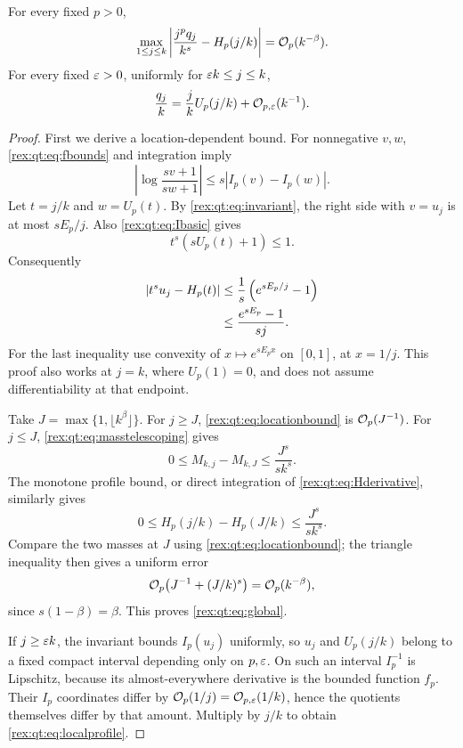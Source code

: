 \begin{theorem}\label{rex:qt:thm:global}
For every fixed $p>0$,
\begin{equation}\label{rex:qt:eq:global}
 \max_{1\le j\le k}\left|\frac{j^p q_j}{k^s}-H_p(j/k)\right|
       =\mathcal O_p(k^{-\beta}).
\end{equation}
For every fixed $\varepsilon>0$, uniformly for $\varepsilon k\le j\le k$,
\begin{equation}\label{rex:qt:eq:localprofile}
 \frac{q_j}{k}=\frac jk U_p(j/k)+\mathcal O_{p,\varepsilon}(k^{-1}).
\end{equation}
\end{theorem}
\begin{proof}
First we derive a location-dependent bound. For nonnegative $v,w$, \eqref{rex:qt:eq:fbounds} and integration imply
\begin{equation}\label{rex:qt:eq:logcomparison}
 \left|\log\frac{sv+1}{sw+1}\right|
 \le s\left|I_p(v)-I_p(w)\right|.
\end{equation}
Let $t=j/k$ and $w=U_p(t)$. By \eqref{rex:qt:eq:invariant}, the right side with $v=u_j$ is at most $sE_p/j$. Also \eqref{rex:qt:eq:Ibasic} gives
\begin{equation}\label{rex:qt:eq:weightbound}
 t^s(sU_p(t)+1)\le1.
\end{equation}
Consequently
\begin{align}
 \left|t^s u_j-H_p(t)\right|
 &\le\frac1s\left(e^{sE_p/j}-1\right)\notag\\
 &\le\frac{e^{sE_p}-1}{sj}.
 \label{rex:qt:eq:locationbound}
\end{align}
For the last inequality use convexity of $x\mapsto e^{sE_p x}$ on $[0,1]$, at $x=1/j$. This proof also works at $j=k$, where $U_p(1)=0$, and does not assume differentiability at that endpoint.

Take $J=\max\{1,\lfloor k^\beta\rfloor\}$. For $j\ge J$, \eqref{rex:qt:eq:locationbound} is $\mathcal O_p(J^{-1})$. For $j\le J$, \eqref{rex:qt:eq:masstelescoping} gives
\[
 0\le M_{k,j}-M_{k,J}\le\frac{J^s}{s k^s}.
\]
The monotone profile bound, or direct integration of \eqref{rex:qt:eq:Hderivative}, similarly gives
\[
 0\le H_p(j/k)-H_p(J/k)\le\frac{J^s}{s k^s}.
\]
Compare the two masses at $J$ using \eqref{rex:qt:eq:locationbound}; the triangle inequality then gives a uniform error
\[
 \mathcal O_p\bigl(J^{-1}+(J/k)^s\bigr)=\mathcal O_p(k^{-\beta}),
\]
since $s(1-\beta)=\beta$. This proves \eqref{rex:qt:eq:global}.

If $j\ge\varepsilon k$, the invariant bounds $I_p(u_j)$ uniformly, so $u_j$ and $U_p(j/k)$ belong to a fixed compact interval depending only on $p,\varepsilon$. On such an interval $I_p^{-1}$ is Lipschitz, because its almost-everywhere derivative is the bounded function $f_p$. Their $I_p$ coordinates differ by $\mathcal O_p(1/j)=\mathcal O_{p,\varepsilon}(1/k)$, hence the quotients themselves differ by that amount. Multiply by $j/k$ to obtain \eqref{rex:qt:eq:localprofile}.
\end{proof}

